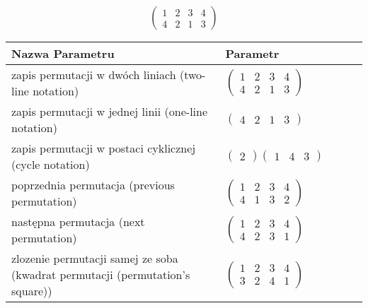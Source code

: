 \documentclass[12pt]{article}
\begin{document}
\subsection{}
\begin{center}
\[
\begin{pmatrix}
	1 & 2 & 3 & 4 \\ 
	4 & 2 & 1 & 3 
\end{pmatrix}
\]

\begin{tabular}{|m{0.6\linewidth}|m{0.4\linewidth}|}
	\hline
	Nazwa Parametru & Parametr \\
	\hline
	zapis permutacji w dwóch liniach (two-line notation) & $\begin{pmatrix} 1 & 2 & 3 & 4 \\ 
4 & 2 & 1 & 3 \end{pmatrix}$ \\ 
	\hline
	zapis permutacji w jednej linii (one-line notation) & $\begin{pmatrix} 4 & 2 & 1 & 3 \end{pmatrix}$ \\ 
	\hline
	zapis permutacji w postaci cyklicznej (cycle notation) & $\begin{pmatrix} 2 \end{pmatrix} \begin{pmatrix} 1 & 4 & 3 \end{pmatrix} $ \\ 
	\hline
	poprzednia permutacja (previous permutation) & $\begin{pmatrix} 1 & 2 & 3 & 4 \\ 
4 & 1 & 3 & 2 \end{pmatrix}$ \\ 
	\hline
	następna permutacja (next permutation) & $\begin{pmatrix} 1 & 2 & 3 & 4 \\ 
4 & 2 & 3 & 1 \end{pmatrix}$ \\ 
	\hline
	zlozenie permutacji samej ze soba (kwadrat permutacji (permutation's square)) & $\begin{pmatrix} 1 & 2 & 3 & 4 \\ 
3 & 2 & 4 & 1 \end{pmatrix}$ \\ 
	\hline
\end{tabular}
\end{center}
\end{document}
